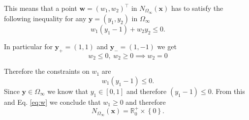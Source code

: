 \documentclass{article}
\newcommand{\vect}[1]{\mathbf{#1}}
\newcommand{\set}[1]{\left\{ #1 \right\}}
\begin{document}
{\begin{enumerate}
This means that a point $\vect{w} = (w_1,w_2)^\top$ in $N_{\Omega_\infty}(\vect{x})$ has to satisfy the following inequality for any
$\vect{y} = (y_1,y_2)$ in $\Omega_\infty$
\begin{equation*}
w_1(y_1-1) + w_2y_2 \leq 0.
\end{equation*}

In particular for $\vect{y_+} = (1,1)$ and $\vect{y_-} = (1,-1)$ we get
\begin{equation*}
w_2\leq 0,\ w_2\geq 0 \implies w_2 = 0
\end{equation*}

Therefore the constraints on $w_1$ are
\begin{equation}\label{eq:w}
w_1(y_1-1)\leq 0.
\end{equation}
Since $\vect{y}\in\Omega_\infty$ we know that $y_1\in[0,1]$ and therefore $(y_1-1)\leq 0$. From this and Eq. \eqref{eq:w} we conclude that
$w_1 \geq 0$ and therefore
\begin{equation*}
N_{\Omega_\infty}(\vect{x}) = \mathbb{R}_0^+\times \set{0}.
\end{equation*}


\end{enumerate}
}
\end{document}

